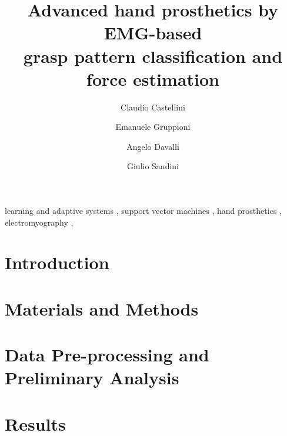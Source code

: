 \documentclass[review,12pt]{elsarticle}
\begin{document}
\begin{frontmatter}

\title{Advanced hand prosthetics by EMG-based\\
grasp pattern classification and force estimation}

\author[liralab]{Claudio Castellini}
\author[inail]{Emanuele Gruppioni}
\author[inail]{Angelo Davalli}
\author[iit]{Giulio Sandini}

\address[liralab]{LIRA-Lab, University of Genova,
  viale F. Causa 13, 16145 Genova (Italy)}
\address[inail]{INAIL Centro Protesi,
  via Rabuina 14, 40054 Vigorso di Budrio (Bologna, Italy)}
\address[iit]{RBCS Department, Italian Institute of Technology,
  via Morego 30, 16163 Genova (Italy)}


\begin{abstract}
  
\end{abstract}

\begin{keyword}
  learning and adaptive systems \sep
  support vector machines \sep
  hand prosthetics \sep
  electromyography \sep  
\end{keyword}

\end{frontmatter}

\section{Introduction}
\label{sec:intro}


\section{Materials and Methods}
\label{sec:m&ms}


\section{Data Pre-processing and Preliminary Analysis}
\label{sec:pre}


\section{Results}
\label{sec:exp}

\end{document}
